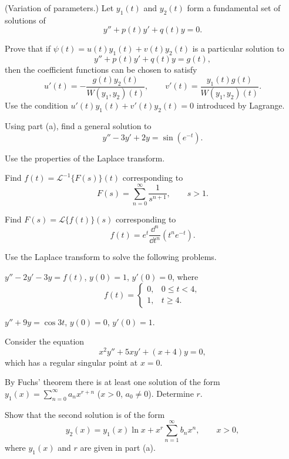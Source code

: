 \documentclass[11pt,oneside]{article}
\begin{document}
\begin{problem}
(Variation of parameters.) Let $y_1(t)$ and $y_2(t)$ form a fundamental set of solutions of
\[y''+p(t)y'+q(t)y=0.\]
\begin{problemsubparts}
\item Prove that if $\psi(t)=u(t)y_1(t)+v(t)y_2(t)$ is a particular solution to
\[y''+p(t)y'+q(t)y=g(t),\]
then the coefficient functions can be chosen to satisfy
\[u'(t)=-\frac{g(t)y_2(t)}{W(y_1,y_2)(t)},\qquad v'(t)=\frac{y_1(t)g(t)}{W(y_1,y_2)(t)}.\]
Use the condition $u'(t)y_1(t)+v'(t)y_2(t)=0$ introduced by Lagrange.
\item Using part (a), find a general solution to
\[y''-3y'+2y=\sin(e^{-t}).\]
\end{problemsubparts}
\end{problem}

\begin{problem}
Use the properties of the Laplace transform.
\begin{problemsubparts}
\item Find $f(t)=\mathcal L^{-1}\{F(s)\}(t)$ corresponding to
\[F(s)=\sum_{n=0}^{\infty}\frac{1}{s^{n+1}},\qquad s>1.\]
\item Find $F(s)=\mathcal L\{f(t)\}(s)$ corresponding to
\[f(t)=e^t\frac{\dd^n}{\dd t^n}(t^ne^{-t}).\]
\end{problemsubparts}
\end{problem}

\begin{problem}
Use the Laplace transform to solve the following problems.
\begin{problemsubparts}
\item $y''-2y'-3y=f(t)$, $y(0)=1$, $y'(0)=0$, where
\[f(t)=\begin{cases}0,&0\le t<4,\\1,&t\ge4.\end{cases}\]
\item $y''+9y=\cos3t$, $y(0)=0$, $y'(0)=1$.
\end{problemsubparts}
\end{problem}

\begin{problem}
Consider the equation
\[x^2y''+5xy'+(x+4)y=0,\]
which has a regular singular point at $x=0$.
\begin{problemsubparts}
\item By Fuchs' theorem there is at least one solution of the form $y_1(x)=\sum_{n=0}^{\infty}a_nx^{r+n}$ ($x>0$, $a_0\ne0$). Determine $r$.
\item Show that the second solution is of the form
\[y_2(x)=y_1(x)\ln x+x^r\sum_{n=1}^{\infty}b_nx^n,\qquad x>0,\]
where $y_1(x)$ and $r$ are given in part (a).
\end{problemsubparts}
\end{problem}
\end{document}

